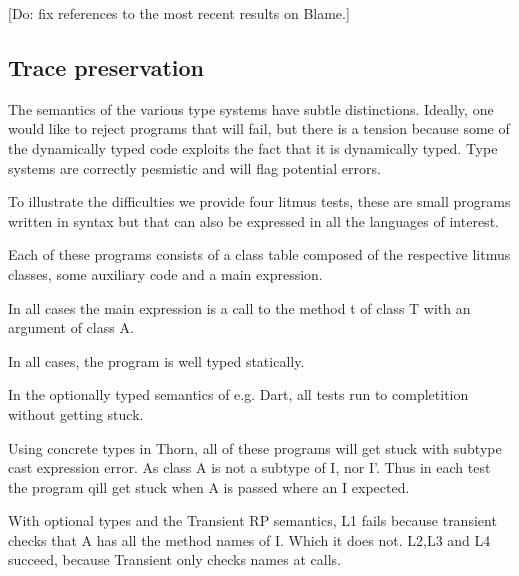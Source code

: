 \documentclass[a4paper,USenglish]{tex/lipics-v2016}
\begin{document}
[Do: fix references to the most recent results on Blame.]

\subsection{Trace preservation}

The semantics of the various type systems have subtle distinctions. Ideally,
one would like to reject programs that will fail, but there is a tension
because some of the dynamically typed code exploits the fact that it is
dynamically typed.  Type systems are correctly pesmistic and will flag
potential errors.

To illustrate the difficulties we provide four litmus tests, these are small
programs written in \kafka syntax but that can also be expressed in all the
languages of interest.

Each of these programs consists of a class table composed of the respective
litmus classes, some auxiliary code and a main expression.

In all cases the main expression is a call to the method t of class T with an argument of class A.

In all cases, the program is well typed statically.

In the optionally typed semantics of e.g. Dart, all tests run to
completition without getting stuck.

Using concrete types in Thorn, all of these programs will get stuck with
subtype cast expression error. As class A is not a subtype of I, nor I'.
Thus in each test the program qill get stuck when A is passed where an I
expected.

With optional types and the Transient RP semantics, L1 fails because transient
checks that A has all the method names of I. Which it does not.
L2,L3 and L4 succeed, because Transient only checks names at calls.
\end{document}
